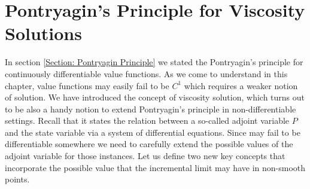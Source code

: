





    


\section{Pontryagin's Principle for Viscosity Solutions}

In section \ref{Section: Pontryagin Principle} we stated the Pontryagin's principle for continuously differentiable value functions. 
As we come to understand in this chapter, value functions may easily fail to be $C^1$ which requires a weaker notion of solution. We have introduced 
the concept of viscosity solution, which turns out to be also a handy notion to extend Pontryagin's principle in non-differentiable settings. 
Recall that it states the relation between a so-called adjoint variable $P$ and the state variable via a system of differential equations. Since may fail 
to be differentiable somewhere we need to carefully extend the possible values of the adjoint variable for those instances. Let us 
define two new key concepts that incorporate the possible value that the incremental limit may have in non-smooth points. 

